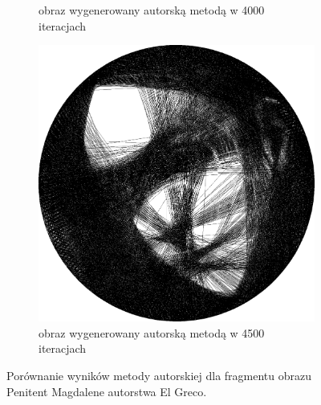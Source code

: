 \begin{figure}[H]
\begin{subfigure}{0.23\textwidth}
            \caption{obraz wygenerowany autorską metodą w 4000 iteracjach}
            \label{comp-comp-magdalene-n}
        \end{subfigure}
        \begin{subfigure}{0.23\textwidth}
            \centering
            \includegraphics[width = \textwidth]{img/6-comp/magdalene_e_i4500_c20_inv0_bg10_obj1_ed1.png}
            \caption{obraz wygenerowany autorską metodą w 4500 iteracjach}
            \label{comp-comp-magdalene-o}
        \end{subfigure}
        \caption{Porównanie wyników metody autorskiej dla fragmentu obrazu Penitent Magdalene autorstwa El Greco.}
        \label{comp-comp-magdalene}
        \end{figure}
        
